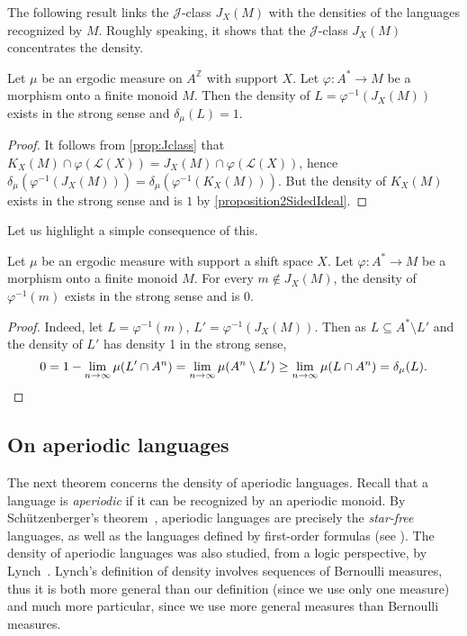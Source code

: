 \documentclass[a4paper,UKenglish,numberwithinsect,cleveref]{lipics-v2021}
\newcommand{\JJ}{\mathrel{\mathscr{J}}}
\newcommand{\Z}{\mathbb{Z}}
\newcommand{\cL}{\mathcal L}
\newcommand*{\from}{\colon}
\begin{document}
The following result links the $\JJ$-class $J_X(M)$ with the densities of the languages recognized by $M$. Roughly speaking, it shows that the $\JJ$-class $J_X(M)$ concentrates the density. 

\begin{proposition}\label{p:density-concentration}
    Let $\mu$ be an ergodic measure on $A^\Z$ with support $X$. Let $\varphi\from A^*\to M$ be a morphism onto a finite monoid $M$. Then the density of $L = \varphi^{-1}(J_X(M))$ exists in the strong sense and $\delta_\mu(L) = 1$.
\end{proposition}

\begin{proof}
    It follows from \cref{prop:Jclass} that $K_X(M)\cap\varphi(\cL(X)) =  J_X(M)\cap\varphi(\cL(X))$, hence $\delta_\mu(\varphi^{-1}(J_X(M)))=\delta_\mu(\varphi^{-1}(K_X(M)))$. But the density of $K_X(M)$ exists in the strong sense and is $1$ by \cref{proposition2SidedIdeal}.
\end{proof}

Let us highlight a simple consequence of this.
\begin{corollary}\label{c:density-0}
    Let $\mu$ be an ergodic measure with support a shift space $X$. Let $\varphi\from A^*\to M$ be a morphism onto a finite monoid $M$. For every $m\notin J_X(M)$, the density of $\varphi^{-1}(m)$ exists in the strong sense and is 0. 
\end{corollary}

\begin{proof}
    Indeed, let $L = \varphi^{-1}(m)$, $L'=\varphi^{-1}(J_X(M))$. Then as $L\subseteq A^*\setminus L'$ and the density of $L'$ has density 1 in the strong sense,
    \begin{equation*}
        0= 1-\lim_{n\to\infty}\mu(L'\cap A^n) =\lim_{n\to\infty}\mu(A^n\setminus L') \geq  \lim_{n\to\infty}\mu(L\cap A^n) = \delta_\mu(L).\qedhere
    \end{equation*}
\end{proof}

\subsection{On aperiodic languages} \label{subsec:aperiod}
The next theorem concerns the density of aperiodic languages. Recall that a language is \emph{aperiodic} if it can be recognized by an aperiodic monoid. By Schützenberger's theorem~\cite{Schutzenberger1965a}, aperiodic languages are precisely the \emph{star-free} languages, as well as the languages defined by first-order formulas (see \cite[Theorem~4.1]{book/Perrin2004}). The density of aperiodic languages was also studied, from a logic perspective, by Lynch~\cite{Lynch1993}. Lynch's definition of density involves sequences of Bernoulli measures, thus it is both more general than our definition (since we use only one measure) and much more particular, since we use more general measures than Bernoulli measures.
\end{document}
